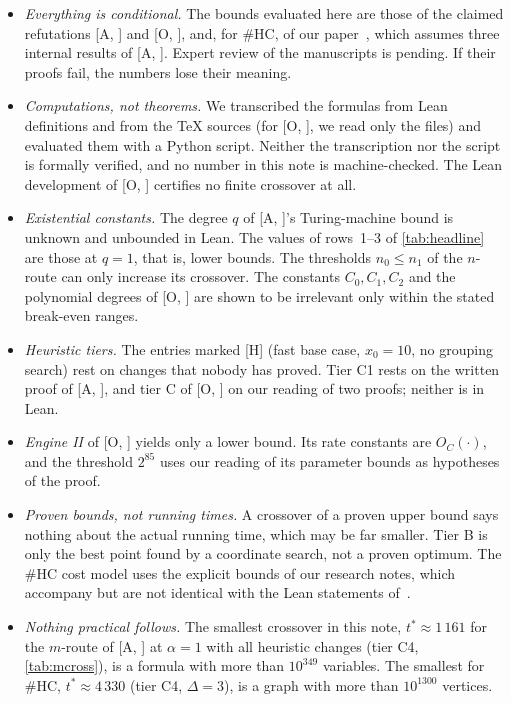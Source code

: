 \documentclass[10pt]{amsart}
\theoremstyle{definition}
\theoremstyle{remark}
\numberwithin{equation}{section}
\newcommand{\A}[1][]{\textup{[A\if\relax\detokenize{#1}\relax\else, #1\fi]}}
\newcommand{\Oa}[1][]{\textup{[O\if\relax\detokenize{#1}\relax\else, #1\fi]}}
\newcommand{\HC}{\#\mathrm{HC}}
\newcommand{\tst}{t^{*}}
\newcommand{\Hh}{\textup{[H]}}
\begin{document}
\begin{itemize}
\item \emph{Everything is conditional.} The bounds evaluated here are those of the claimed
refutations \A{} and \Oa, and, for $\HC$, of our paper~\cite{Tulsyan26}, which assumes three
internal results of \A. Expert review of the manuscripts is pending. If their proofs fail, the
numbers lose their meaning.
\item \emph{Computations, not theorems.} We transcribed the formulas from Lean definitions and
from the \TeX{} sources (for \Oa, we read only the  files) and evaluated them with a Python
script. Neither the transcription nor the script is formally verified, and no number in this note
is machine-checked. The Lean development of \Oa{} certifies no finite crossover at all.
\item \emph{Existential constants.} The degree $q$ of \A's Turing-machine bound is unknown and
unbounded in Lean. The values of rows~1--3 of \cref{tab:headline} are those at $q=1$, that is, lower
bounds. The thresholds $n_0\le n_1$ of the $n$-route can only increase its crossover. The
constants $C_0,C_1,C_2$ and the polynomial degrees of \Oa{} are shown to be irrelevant only within
the stated break-even ranges.
\item \emph{Heuristic tiers.} The entries marked \Hh{} (fast base case, $x_0=10$, no grouping
search) rest on changes that nobody has proved. Tier C1 rests on the written proof of \A{}, and
tier C of \Oa{} on our reading of two proofs; neither is in Lean.
\item \emph{Engine II} of \Oa{} yields only a lower bound. Its rate constants are $O_C(\cdot)$,
and the threshold $2^{85}$ uses our reading of its parameter bounds as hypotheses of the proof.
\item \emph{Proven bounds, not running times.} A crossover of a proven upper bound says nothing
about the actual running time, which may be far smaller. Tier B is only the best point found by a
coordinate search, not a proven optimum. The $\HC$ cost model uses the explicit bounds of our
research notes, which accompany but are not identical with the Lean statements of~\cite{Tulsyan26}.
\item \emph{Nothing practical follows.} The smallest crossover in this note,
$\tst\approx1\,161$ for the $m$-route of \A{} at $\alpha=1$ with all heuristic changes (tier C4,
\cref{tab:mcross}), is a formula with more than $10^{349}$ variables. The smallest for $\HC$,
$\tst\approx4\,330$ (tier C4, $\Delta=3$), is a graph with more than $10^{1300}$ vertices.
\end{itemize}
\end{document}
